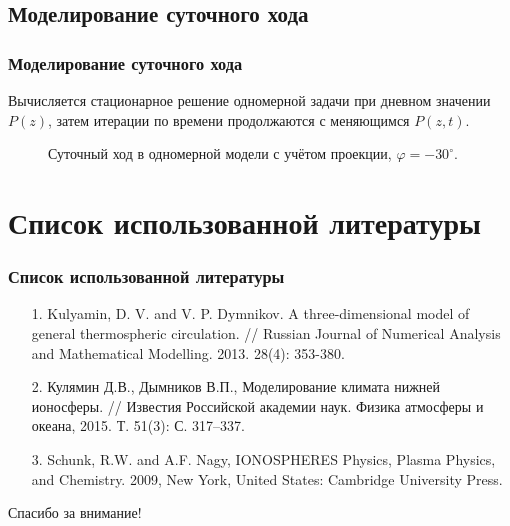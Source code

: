 \documentclass[9pt, apectratio=43,unicode]{beamer}
\begin{document}
\subsection{Моделирование суточного хода}
\begin{frame}\frametitle{Моделирование суточного хода}

Вычисляется стационарное решение одномерной задачи при дневном значении $P(z)$, затем итерации по времени продолжаются с меняющимся $P(z, t)$.

\begin{figure}[H]
\caption{Суточный ход в одномерной модели с учётом проекции, $\varphi = -30^\circ$.}
\end{figure}

\end{frame}

\section{Список использованной литературы}
\begin{frame}\frametitle{Список использованной литературы}

\begin{itemize}
\item[1.] Kulyamin, D. V. and V. P. Dymnikov. A three-dimensional model of general thermospheric circulation. // Russian Journal of Numerical Analysis and Mathematical Modelling. 2013. 28(4): 353-380.
\item[2.] Кулямин Д.В., Дымников В.П., Моделирование климата нижней ионосферы. // Известия Российской академии наук. Физика атмосферы и океана, 2015. Т. 51(3): С. 317–337.
\item[3.] Schunk, R.W. and A.F. Nagy, IONOSPHERES Physics, Plasma Physics, and Chemistry. 2009, New York, United States: Cambridge University Press.
\end{itemize}

\end{frame}

\begin{frame}[plain]
  \begin{center}
  {\Huge Спасибо за внимание!}
  \end{center}
\end{frame}
\end{document}
